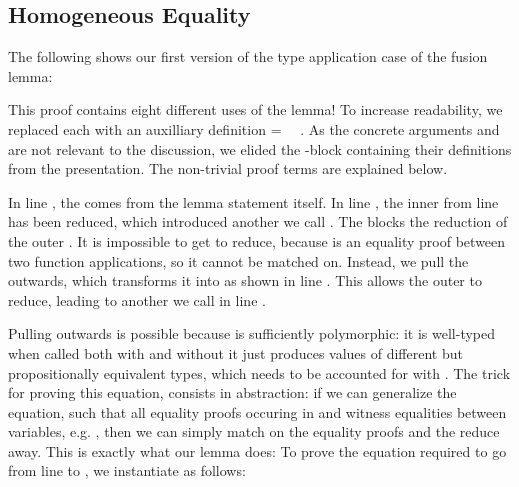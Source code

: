 \documentclass[acmsmall,anonymous,review,screen]{acmart}
\newenvironment{AgdaBlock}{%
  \vspace{\AgdaEmptySkip}%
  \AgdaNoSpaceAroundCode{}%
}{%
  \AgdaSpaceAroundCode{}
}
\begin{document}
\subsection{Homogeneous Equality}
\label{sec:subst-hell:hom}

The following shows our first version of the type application case
{} of the fusion lemma:

\begin{AgdaBlock}
  \SubstExamplesFusionESubESub
  \SubstExamplesFusionESubESubBody
\end{AgdaBlock}

This proof contains eight different uses of the {\Asubst} lemma!
To increase readability, we replaced each {\Asubst} 
with an auxilliary definition { = \Asubst~~}.
As the concrete arguments {} and {} are not relevant to the
discussion, we elided the -block containing their
definitions from the presentation. The non-trivial proof terms {} are explained below.

In line , the {} comes from the lemma statement itself.
In line , the inner {\AEsub} from line  has been reduced, which
introduced another {\Asubst} we call {}.
The {} blocks the reduction of the outer {\AEsub}.
It is impossible to get {} to reduce, because {} is
an equality proof between two function applications, so it cannot be
matched on.
Instead, we pull the {} outwards, which transforms it into
{} as shown in line . This allows the outer {\AEsub}
to reduce, leading to another {\Asubst} we call {} in line .

Pulling {} outwards is possible because {\AEsub} is sufficiently polymorphic:
it is well-typed when called both with and without {} \textemdash{} it just produces values
of different but propositionally equivalent types, which needs to be accounted for with {}.
The trick for proving this equation, consists in abstraction:
if we can generalize the equation, such that all equality proofs occuring in {}
and  {} witness equalities between variables, e.g. , then
we can simply match on the equality proofs and the {} reduce away.
This is exactly what our {} lemma does:
\SubstExamplesDistSubst
To prove the equation required to go from line  to , we
instantiate {} as follows:
\SubstExamplesFusionESubESubBodyProofA
\end{document}

